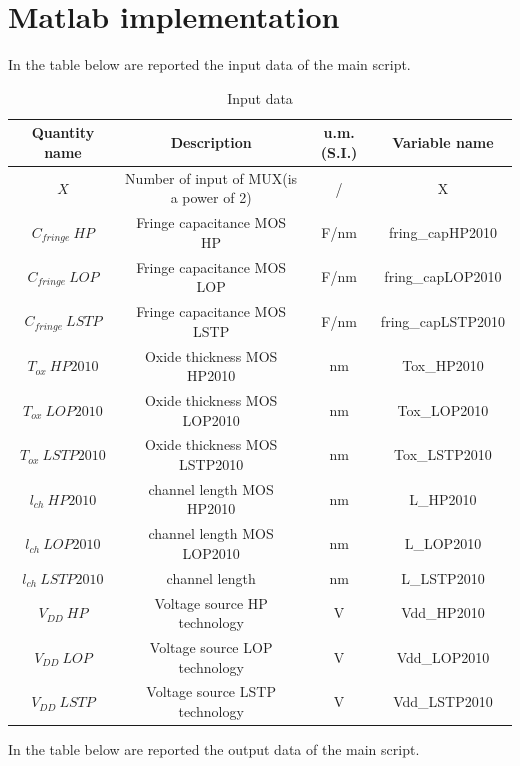 \section{Matlab implementation}
In the table below are reported the input data of the main script.

\begin{table}[h]
	\begin{center}
		\begin{tabular}{|c|c|c|c|} \hline
			\textbf{Quantity name} & \textbf{Description} & \textbf{u.m. (S.I.)} & \textbf{Variable name} \\ \hline
			$X$ &Number of input of MUX(is a power of 2) & / & X \\ 
			$C_{fringe}\ HP$ &Fringe capacitance MOS HP & F/nm & fring\_capHP2010 \\ 
			$C_{fringe} \ LOP$ &Fringe capacitance MOS LOP & F/nm & fring\_capLOP2010 \\ 
			$C_{fringe}\ LSTP$ &Fringe capacitance MOS LSTP & F/nm & fring\_capLSTP2010 \\
			$T_{ox}\ HP2010$ &Oxide thickness MOS HP2010 & nm & Tox\_HP2010 \\ 
			$T_{ox}\ LOP2010$ &Oxide thickness MOS LOP2010 & nm & Tox\_LOP2010 \\ 
			$T_{ox}\ LSTP2010$ &Oxide thickness MOS LSTP2010 & nm & Tox\_LSTP2010 \\
			$l_{ch}\ HP2010$ &channel length MOS HP2010 & nm & L\_HP2010 \\   
			$l_{ch}\ LOP2010$ &channel length MOS LOP2010 & nm & L\_LOP2010 \\
			$l_{ch}\ LSTP2010$ &channel length & nm & L\_LSTP2010 \\     
			$V_{DD}\ HP$ &Voltage source HP technology & V & Vdd\_HP2010 \\   
			$V_{DD}\ LOP$ &Voltage source LOP technology & V & Vdd\_LOP2010 \\ 
			$V_{DD}\ LSTP$ &Voltage source LSTP technology & V & Vdd\_LSTP2010 \\  \hline
		\end{tabular}
	\end{center}
	\caption{Input data}
	\label{tab1}
\end{table}

In the table below are reported the output data of the main script.

